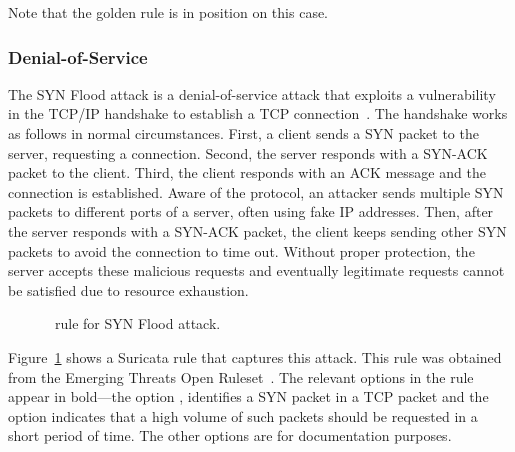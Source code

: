 \documentclass[sigconf,review, anonymous]{acmart}
\begin{document}

Note that the golden rule is in position  on this
case. 

\subsubsection{Denial-of-Service}
\label{sec:dos}


The SYN Flood attack is a denial-of-service attack that exploits a vulnerability in the TCP/IP handshake
to establish a TCP connection~\cite{cloudfare-synflood}. The handshake
works as follows in normal circumstances. First, a client sends a SYN
packet to the server, requesting a connection. Second, the server
responds with a SYN-ACK packet to the client. Third, the client
responds with an ACK message and the connection is established. Aware
of the protocol, an attacker sends multiple SYN packets to different
ports of a server, often using fake IP addresses. Then, after the
server responds with a SYN-ACK packet, the client keeps sending other
SYN packets to avoid the connection to time out. Without proper
protection, the server accepts these malicious requests and eventually
legitimate requests cannot be satisfied due to resource exhaustion.

\vspace{-1ex}
\begin{figure}[h!]
  
  \vspace{-2ex}
  \caption{\suri\ rule for SYN Flood attack.}
  \label{fig:synflood-example}
\end{figure}
\vspace{-2ex}

Figure~\ref{fig:synflood-example} shows a Suricata rule that captures
this attack. This rule was obtained from the Emerging Threats Open
Ruleset~\cite{emerging-threats-open}. The relevant options in the
rule appear in bold---the option , identifies a
SYN packet in a TCP packet and the option  indicates that a high
volume of such packets should be requested in a short period of
time. The other options are for documentation purposes.
\end{document}
